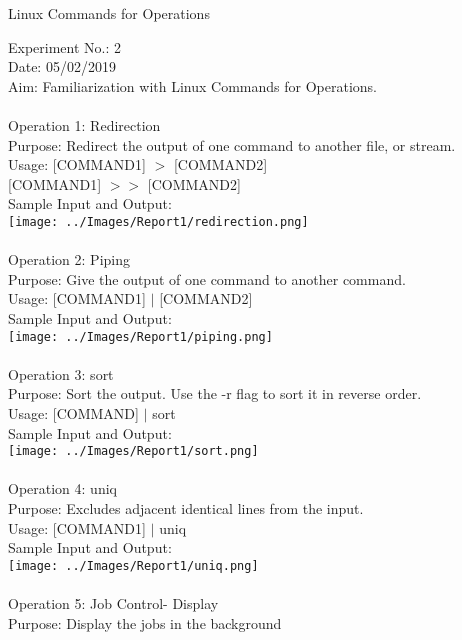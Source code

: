 \documentclass[10pt,a4paper]{report}
\begin{document}
\pagebreak

\begin{center}
\begin{Large}
Linux Commands for Operations
\end{Large}
\end{center}
Experiment No.: 2\\
Date: 05/02/2019\\
Aim: Familiarization with Linux Commands for Operations.\\
\\
Operation 1: Redirection\\
Purpose: Redirect the output of one command to another file, or stream.\\
Usage: [COMMAND1] $>$ [COMMAND2]\\
{[COMMAND1]} $>>$ [COMMAND2]\\
Sample Input and Output:\\
\texttt{[image: ../Images/Report1/redirection.png]}\\
\\
Operation 2: Piping\\
Purpose: Give the output of one command to another command.\\
Usage: [COMMAND1] $|$ [COMMAND2]\\
Sample Input and Output:\\
\texttt{[image: ../Images/Report1/piping.png]}\\
\pagebreak
\\
Operation 3: sort\\
Purpose: Sort the output. Use the -r flag to sort it in reverse order.\\
Usage: [COMMAND] $|$ sort\\
Sample Input and Output:\\
\texttt{[image: ../Images/Report1/sort.png]}\\
\\
Operation 4: uniq\\
Purpose: Excludes adjacent identical lines from the input.\\
Usage: [COMMAND1] $|$ uniq\\
Sample Input and Output:\\
\texttt{[image: ../Images/Report1/uniq.png]}\\
\pagebreak
\\
Operation 5: Job Control- Display\\
Purpose: Display the jobs in the background\\
\end{document}
